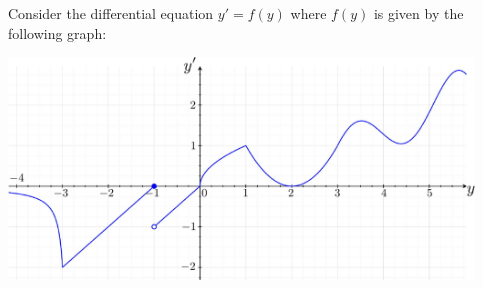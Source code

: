 \begin{lesson}

%	
%
%	

\end{lesson}




\newpage

\question Consider the differential equation \quad $y'=f(y)$ \quad where $f(y)$ is given by the following graph:
\begin{center}
	\includegraphics*[width=350pt]{images/module14-graphf.pdf}
\end{center}

